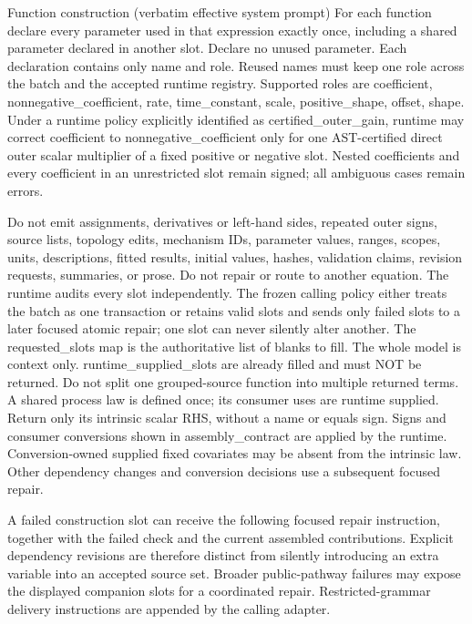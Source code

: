 \begin{afpromptbox}{Function construction (verbatim effective system prompt)}
For each function declare every parameter used in that expression exactly
once, including a shared parameter declared in another slot. Declare no
unused parameter. Each declaration contains only name and role. Reused names
must keep one role across the batch and the accepted runtime registry.
Supported roles are coefficient, nonnegative_coefficient, rate,
time_constant, scale, positive_shape, offset, shape. Under a runtime policy
explicitly identified as certified_outer_gain, runtime may correct
coefficient to nonnegative_coefficient only for one AST-certified direct
outer scalar multiplier of a fixed positive or negative slot. Nested
coefficients and every coefficient in an unrestricted slot remain signed;
all ambiguous cases remain errors.

Do not emit assignments, derivatives or left-hand sides, repeated outer
signs, source lists, topology edits, mechanism IDs, parameter values,
ranges, scopes, units, descriptions, fitted results, initial values, hashes,
validation claims, revision requests, summaries, or prose. Do not repair or
route to another equation. The runtime audits every slot independently. The
frozen calling policy either treats the batch as one transaction or retains
valid slots and sends only failed slots to a later focused atomic repair;
one slot can never silently alter another. The requested_slots map is the
authoritative list of blanks to fill. The whole model is context only.
runtime_supplied_slots are already filled and must NOT be returned. Do not
split one grouped-source function into multiple returned terms. A shared
process law is defined once; its consumer uses are runtime supplied. Return
only its intrinsic scalar RHS, without a name or equals sign. Signs and
consumer conversions shown in assembly_contract are applied by the runtime.
Conversion-owned supplied fixed covariates may be absent from the intrinsic
law. Other dependency changes and conversion decisions use a subsequent
focused repair.
\end{afpromptbox}

A failed construction slot can receive the following focused repair instruction,
together with the failed check and the current assembled contributions. Explicit
dependency revisions are therefore distinct from silently introducing an extra
variable into an accepted source set. Broader public-pathway failures may expose
the displayed companion slots for a coordinated repair. Restricted-grammar
delivery instructions are appended by the calling adapter.

